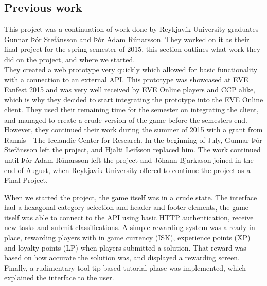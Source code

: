 \subsection{Previous work}
	This project was a continuation of work done by Reykjavík University graduates Gunnar Þór Stefánsson and Þór Adam Rúnarsson. They worked on it as their final project for the spring semester of 2015, this section outlines what work they did on the project, and where we started. \\

	They created a web prototype very quickly which allowed for basic functionality with a connection to an external API. This prototype was showcased at EVE Fanfest 2015 and was very well received by EVE Online players and CCP alike, which is why they decided to start integrating the prototype into the EVE Online client. They used their remaining time for the semester on integrating the client, and managed to create a crude version of the game before the semesters end.
	However, they continued their work during the summer of 2015 with a grant from Rannís - The Icelandic Center for Research. In the beginning of July, Gunnar Þór Stefánsson left the project, and Hjalti Leifsson replaced him. The work continued until Þór Adam Rúnarsson left the project and Jóhann Bjarkason joined in the end of August, when Reykjavík University offered to continue the project as a Final Project.

	When we started the project, the game itself was in a crude state. The interface had a hexagonal category selection and header and footer elements, the game itself was able to connect to the API using basic HTTP authentication, receive new tasks and submit classifications. A simple rewarding system was already in place, rewarding players with in game currency (ISK), experience points (XP) and loyalty points (LP) when players submitted a solution. That reward was based on how accurate the solution was, and displayed a rewarding screen. Finally, a rudimentary tool-tip based tutorial phase was implemented, which explained the interface to the user.
